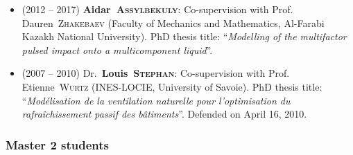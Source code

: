 \documentclass[final, a4paper, oneside, 12pt]{article}
\numberwithin{equation}{section}
\begin{document}
\begin{itemize}
  \item (2012 -- 2017) \textbf{Aidar~\textsc{Assylbekuly}}: Co-supervision with Prof. Dauren~\textsc{Zhakebaev} (Faculty of Mechanics and Mathematics, Al-Farabi Kazakh National University). PhD thesis title: ``\textit{Modelling of the multifactor pulsed impact onto a multicomponent liquid}''.

  \item (2007 -- 2010) Dr.~\textbf{Louis~\textsc{Stephan}}: Co-supervision with Prof. Etienne~\textsc{Wurtz} (INES-LOCIE, University of Savoie). PhD thesis title: ``\textit{Mod\'elisation de la ventilation naturelle pour l'optimisation du rafra\^ichissement passif des b\^atiments}''. Defended on April 16, 2010.
  
\end{itemize}

\subsubsection{Master 2 students}
\end{document}

